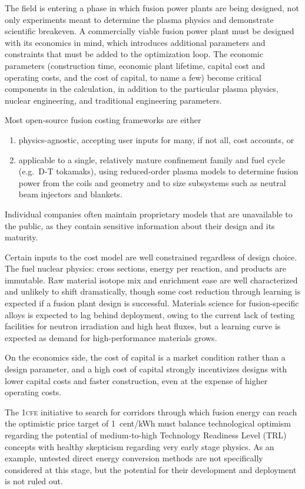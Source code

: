 \documentclass{article}
\begin{document}
The field is entering a phase in which fusion power plants are being designed,
not only experiments meant to determine the plasma physics and demonstrate scientific breakeven.
A commercially viable fusion power plant must be designed with its economics in mind, which introduces
additional parameters and constraints that must be added to the optimization loop.
The economic parameters (construction time, economic plant lifetime, capital cost and operating costs,
and the cost of capital, to name a few) become critical components in the calculation, in addition to the
particular plasma physics, nuclear engineering, and traditional engineering parameters.

Most open-source fusion costing frameworks are either
\begin{enumerate}
\item physics-agnostic, accepting user inputs for many, if not all, cost
  accounts, or
\item applicable to a single, relatively mature confinement family and fuel
  cycle (e.g.\ D-T tokamaks), using reduced-order plasma models to
  determine fusion power from the coils and geometry and to size subsystems
  such as neutral beam injectors and blankets.
\end{enumerate}
Individual companies often maintain proprietary models that are unavailable
to the public, as they contain sensitive information about their design and
its maturity.

Certain inputs to the cost model are well constrained regardless of design
choice. The fuel nuclear physics: cross sections, energy per reaction, and
products are immutable. Raw material isotope mix and enrichment ease are
well characterized and unlikely to shift dramatically, though some cost
reduction through learning is expected if a fusion plant design is successful.
Materials science for fusion-specific alloys is expected to lag behind deployment,
owing to the current lack of testing facilities for neutron irradiation and high heat fluxes,
but a learning curve is expected as demand for high-performance materials grows.

On the economics side, the cost of capital is a market condition rather
than a design parameter, and a high cost of capital strongly incentivizes
designs with lower capital costs and faster construction, even at the
expense of higher operating costs.

The \textsc{1cfe} initiative to search for corridors through which fusion energy can reach the
optimistic price target of 1~cent/kWh must balance technological optimism regarding the
potential of medium-to-high Technology Readiness Level (TRL) concepts with healthy skepticism
regarding very early stage physics. As an example, untested direct energy conversion methods are
not specifically considered at this stage, but the potential for their development and deployment is not ruled out.
\end{document}
